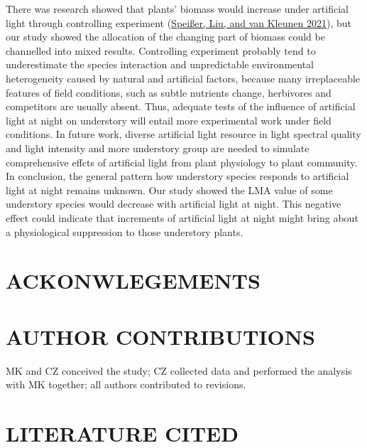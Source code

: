 \documentclass[
  letterpaper,
  DIV=11,
  numbers=noendperiod]{scrartcl}
\begin{document}
There was research showed that plants' biomass would increase under
artificial light through controlling experiment
(\protect\hyperlink{ref-Speisser2021a}{Speißer, Liu, and van Kleunen
2021}), but our study showed the allocation of the changing part of
biomass could be channelled into mixed results. Controlling experiment
probably tend to underestimate the species interaction and unpredictable
environmental heterogeneity caused by natural and artificial factors,
because many irreplaceable features of field conditions, such as subtle
nutrients change, herbivores and competitors are usually absent. Thus,
adequate tests of the influence of artificial light at night on
understory will entail more experimental work under field conditions. In
future work, diverse artificial light resource in light spectral quality
and light intensity and more understory group are needed to simulate
comprehensive effcts of artificial light from plant physiology to plant
community. In conclusion, the general pattern how understory species
responds to artificial light at night remains unknown. Our study showed
the LMA value of some understory species would decrease with artificial
light at night. This negative effect could indicate that increments of
artificial light at night might bring about a physiological suppression
to those understory plants.

\hypertarget{ackonwlegements}{%
\section{ACKONWLEGEMENTS}\label{ackonwlegements}}

\hypertarget{author-contributions}{%
\section{AUTHOR CONTRIBUTIONS}\label{author-contributions}}

MK and CZ conceived the study; CZ collected data and performed the
analysis with MK together; all authors contributed to revisions.

\hypertarget{literature-cited}{%
\section{LITERATURE CITED}\label{literature-cited}}
\end{document}

